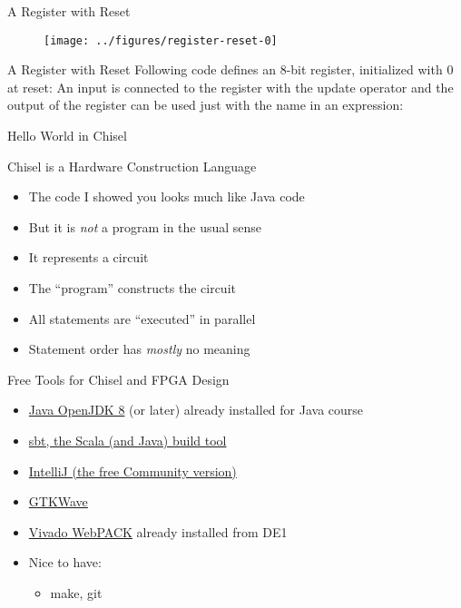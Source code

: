 \begin{frame}[fragile]{A Register with Reset}
\begin{figure}
  \texttt{[image: ../figures/register-reset-0]}
\end{figure}
\end{frame}


\begin{frame}[fragile]{A Register with Reset}
Following code defines an 8-bit register, initialized with 0 at reset:
\noindent An input is connected to the register with the \code{:=} update operator and
the output of the register can be used just with the name in an expression:
\end{frame}


\begin{frame}[fragile]{Hello World in Chisel}
\end{frame}

\begin{frame}[fragile]{Chisel is a Hardware Construction Language}
\begin{itemize}
\item The code I showed you looks much like Java code
\item But it is \emph{not} a program in the usual sense
\item It represents a circuit
\item The ``program'' constructs the circuit
\item All statements are ``executed'' in parallel
\item Statement order has \emph{mostly} no meaning
\end{itemize}
\end{frame}

\begin{frame}[fragile]{Free Tools for Chisel and FPGA Design}
\begin{itemize}
\item \href{https://adoptopenjdk.net/}{Java OpenJDK 8} (or later) already installed for Java course
\item \href{https://www.scala-sbt.org/}{sbt, the Scala (and Java) build tool}
\item \href{https://www.jetbrains.com/idea/download/}{IntelliJ (the free Community version)}
\item \href{http://gtkwave.sourceforge.net/}{GTKWave}
\item \href{https://www.xilinx.com/products/design-tools/vivado/vivado-webpack.html}{Vivado WebPACK} already installed from DE1
\item Nice to have:
\begin{itemize}
\item make, git
\end{itemize}
\end{itemize}
\end{frame}

